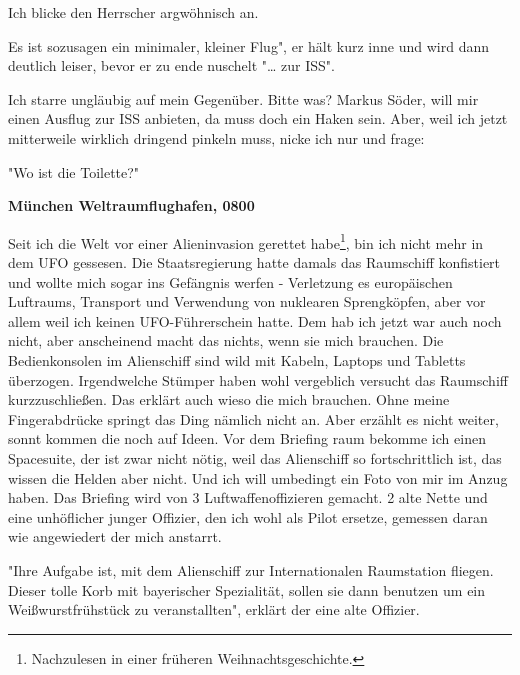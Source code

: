 \documentclass[20pt]{extarticle}
\begin{document}
Ich blicke den Herrscher argwöhnisch an.

\begin{center}
\grqq Es ist sozusagen ein minimaler, kleiner Flug", er hält kurz
inne und wird dann deutlich leiser, bevor er zu ende nuschelt "\dots{}
zur ISS".
\end{center}

Ich starre ungläubig auf mein Gegenüber. Bitte was? Markus Söder,
will mir einen Ausflug zur ISS anbieten, da muss doch ein Haken
sein. Aber, weil ich jetzt mitterweile wirklich dringend pinkeln
muss, nicke ich nur und frage:

\begin{center}
"Wo ist die Toilette?"
\end{center}

\textbf{München Weltraumflughafen, 0800}
\newline 

Seit ich die Welt vor einer Alieninvasion gerettet habe\footnote{Nachzulesen in einer früheren Weihnachtsgeschichte.}, bin
ich nicht mehr in dem UFO gessesen. Die Staatsregierung hatte damals
das Raumschiff konfistiert und wollte mich sogar ins Gefängnis
werfen - Verletzung es europäischen Luftraums, Transport und
Verwendung von nuklearen Sprengköpfen, aber vor allem weil ich
keinen UFO-Führerschein hatte. Dem hab ich jetzt war auch noch
nicht, aber anscheinend macht das nichts, wenn sie mich
brauchen. Die Bedienkonsolen im Alienschiff sind wild mit Kabeln,
Laptops und Tabletts überzogen. Irgendwelche Stümper haben wohl
vergeblich versucht das Raumschiff kurzzuschließen. Das erklärt auch
wieso die mich brauchen. Ohne meine Fingerabdrücke springt das Ding
nämlich nicht an. Aber erzählt es nicht weiter, sonnt kommen die
noch auf Ideen. Vor dem Briefing raum bekomme ich einen Spacesuite,
der ist zwar nicht nötig, weil das Alienschiff so fortschrittlich
ist, das wissen die Helden aber nicht. Und ich will umbedingt ein
Foto von mir im Anzug haben. Das Briefing wird von 3
Luftwaffenoffizieren gemacht. 2 alte Nette und eine unhöflicher
junger Offizier, den ich wohl als Pilot ersetze, gemessen daran wie
angewiedert der mich anstarrt.

\begin{center}
"Ihre Aufgabe ist, mit dem Alienschiff zur Internationalen
Raumstation fliegen. Dieser tolle Korb mit bayerischer Spezialität,
sollen sie dann benutzen um ein Weißwurstfrühstück zu
veranstallten", erklärt der eine alte Offizier.
\end{center}
\end{document}
